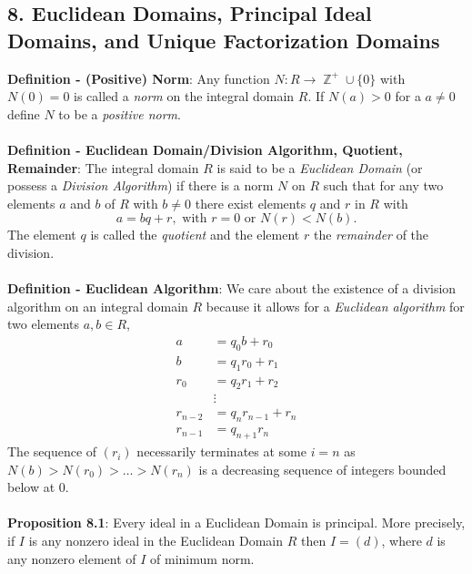 \documentclass{article}
\DeclareMathOperator{\Z}{\mathbb{Z}}
\begin{document}
\subsection*{8. Euclidean Domains, Principal Ideal Domains, and Unique Factorization Domains}
\textbf{Definition - (Positive) Norm}: Any function $N: R \rightarrow \Z^+ \cup \{0\}$ with $N(0) = 0$ is called a \textit{norm} on the integral domain $R$. If $N(a) > 0$ for a $a \neq 0$ define $N$ to be a \textit{positive norm}. \\ \\
\textbf{Definition - Euclidean Domain/Division Algorithm, Quotient, Remainder}: The integral domain $R$ is said to be a \textit{Euclidean Domain} (or possess a \textit{Division Algorithm}) if there is a norm $N$ on $R$ such that for any two elements $a$ and $b$ of $R$ with $b \neq 0$ there exist elements $q$ and $r$ in $R$ with $$a = bq + r, \text{ with } r = 0 \text{ or } N(r) < N(b).$$ The element $q$ is called the \textit{quotient} and the element $r$ the \textit{remainder} of the division. \\ \\
\textbf{Definition - Euclidean Algorithm}: We care about the existence of a division algorithm on an integral domain $R$ because it allows for a \textit{Euclidean algorithm} for two elements $a, b \in R$, \begin{align}
    a &= q_0b + r_0 \\
    b &= q_1 r_0 + r_1 \\ 
    r_0 &= q_2 r_1 + r_2 \\
    &\vdots \\
    r_{n - 2} &= q_n r_{n - 1} + r_n \\
    r_{n - 1} &= q_{n + 1} r_n
\end{align} The sequence of $(r_i)$ necessarily terminates at some $i = n$ as $N(b) > N(r_0) > \dots > N(r_n)$ is a decreasing sequence of integers bounded below at 0. \\ \\
\textbf{Proposition 8.1}: Every ideal in a Euclidean Domain is principal. More precisely, if $I$ is any nonzero ideal in the Euclidean Domain $R$ then $I = (d)$, where $d$ is any nonzero
element of $I$ of minimum norm. \\ \\
\end{document}
